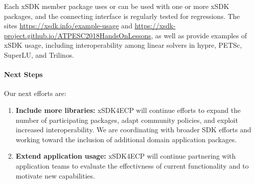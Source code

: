 Each xSDK member package uses or can be used with one or more xSDK packages, and the connecting interface is regularly tested for regressions.  
The sites \url{https://xsdk.info/example-usage} and 
\url{https://xsdk-project.github.io/ATPESC2018HandsOnLessons}, as well as
\cite{Klinvex-xSDKTrilinos} provide examples of
xSDK usage, including interoperability among linear solvers in hypre,
PETSc, SuperLU, and Trilinos.


\paragraph{Next Steps}


Our next efforts are:
\begin{enumerate}
	\item \textbf{Include more libraries:} xSDK4ECP will continue efforts to expand the number of participating packages, adapt community policies, and exploit increased interoperability.  We are coordinating with broader SDK efforts and working toward the inclusion of additional domain application packages.
	\item \textbf{Extend application usage:}  xSDK4ECP will continue partnering with application teams to evaluate the effectivness of current functionality and to motivate new capabilities.
	
\end{enumerate}
